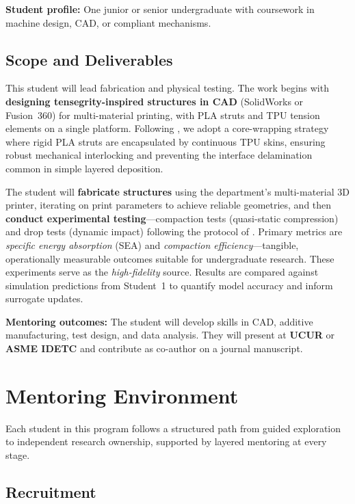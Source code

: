 \documentclass[11pt]{article}
\begin{document}
\textbf{Student profile:} One junior or senior undergraduate with coursework in
machine design, CAD, or compliant mechanisms.

\subsection*{Scope and Deliverables}

This student will lead fabrication and physical testing.  The work begins with
\textbf{designing tensegrity-inspired structures in CAD} (SolidWorks or
Fusion~360) for multi-material printing, with PLA struts and TPU tension
elements on a single platform.  Following \citet{ye2023multimaterial}, we adopt
a core-wrapping strategy where rigid PLA struts are encapsulated by continuous
TPU skins, ensuring robust mechanical interlocking and preventing the interface
delamination common in simple layered deposition.

The student will \textbf{fabricate structures} using the department's
multi-material 3D printer, iterating on print parameters to achieve reliable
geometries, and then \textbf{conduct experimental testing}---compaction tests
(quasi-static compression) and drop tests (dynamic impact) following the
protocol of \citet{pajunen2019design}.  Primary metrics are \emph{specific
energy absorption} (SEA) and \emph{compaction efficiency}---tangible,
operationally measurable outcomes suitable for undergraduate research.  These
experiments serve as the \emph{high-fidelity} source.  Results are compared
against simulation predictions from Student~1 to quantify model accuracy and
inform surrogate updates.

\textbf{Mentoring outcomes:} The student will develop skills in CAD, additive
manufacturing, test design, and data analysis.  They will present at
\textbf{UCUR} or \textbf{ASME IDETC} and contribute as co-author on a journal
manuscript.

\section{Mentoring Environment}
\label{sec:mentoring}

Each student in this program follows a structured path from guided exploration
to independent research ownership, supported by layered mentoring at every
stage.

\subsection*{Recruitment}
\end{document}
